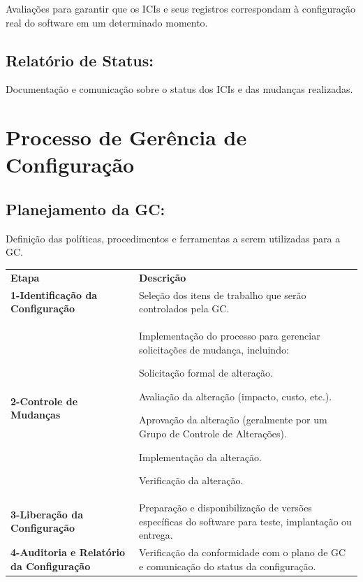 \documentclass[
]{book}
\begin{document}
Avaliações para garantir que os ICIs e seus registros correspondam à configuração real do software em um determinado momento.

\subsection{Relatório de Status:}\label{relatuxf3rio-de-status}

Documentação e comunicação sobre o status dos ICIs e das mudanças realizadas.

\section{Processo de Gerência de Configuração}\label{processo-de-geruxeancia-de-configurauxe7uxe3o}

\subsection{Planejamento da GC:}\label{planejamento-da-gc}

Definição das políticas, procedimentos e ferramentas a serem utilizadas para a GC.

\begin{longtable}[]{@{}
  >{\raggedright\arraybackslash}p{}
  >{\raggedright\arraybackslash}p{}@{}}
\toprule\noalign{}
\endhead
\bottomrule\noalign{}
\endlastfoot
\textbf{Etapa} & \textbf{Descrição} \\
\textbf{1-Identificação da Configuração} & Seleção dos itens de trabalho que serão controlados pela GC. \\
\textbf{2-Controle de Mudanças} & Implementação do processo para gerenciar solicitações de mudança, incluindo:

Solicitação formal de alteração.

Avaliação da alteração (impacto, custo, etc.).

Aprovação da alteração (geralmente por um Grupo de Controle de Alterações).

Implementação da alteração.

Verificação da alteração. \\
\textbf{3-Liberação da Configuração} & Preparação e disponibilização de versões específicas do software para teste, implantação ou entrega. \\
\textbf{4-Auditoria e Relatório da Configuração} & Verificação da conformidade com o plano de GC e comunicação do status da configuração. \\
\end{longtable}
\end{document}
